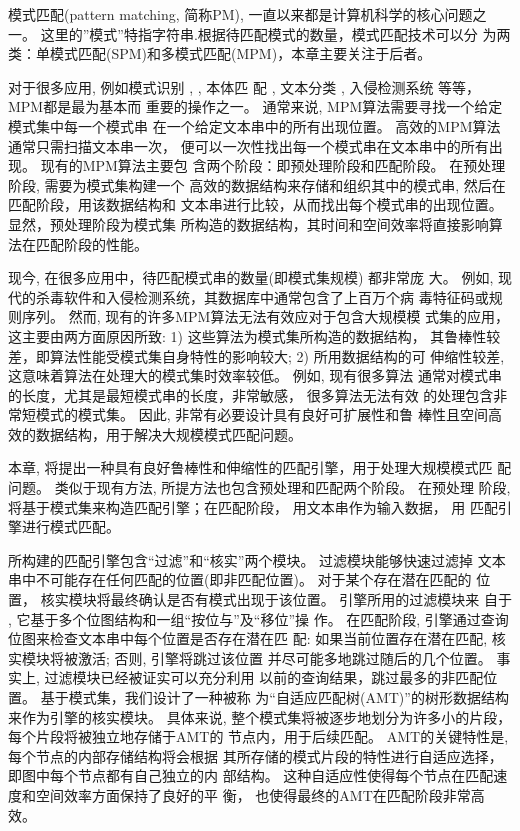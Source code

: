 \documentclass{ws-ijprai}
\begin{document}
模式匹配(pattern matching, 简称PM), 一直以来都是计算机科学的核心问题之
一。 这里的''模式''特指字符串.根据待匹配模式的数量，模式匹配技术可以分
为两类：单模式匹配(SPM)和多模式匹配(MPM)，本章主要关注于后者。

对于很多应用, 例如模式识别 \cite{Yan2016}, \cite{Xiao2016}, 本体匹
配 \cite{Xue2015} \cite{Xue2016}, 文本分类 \cite{Tang2015}
\cite{Zhang2016}, 入侵检测系统 \cite{Kim2015} 等等， MPM都是最为基本而
重要的操作之一。 通常来说, MPM算法需要寻找一个给定模式集中每一个模式串
在一个给定文本串中的所有出现位置。 高效的MPM算法通常只需扫描文本串一次，
便可以一次性找出每一个模式串在文本串中的所有出现。 现有的MPM算法主要包
含两个阶段：即预处理阶段和匹配阶段。 在预处理阶段, 需要为模式集构建一个
高效的数据结构来存储和组织其中的模式串, 然后在匹配阶段，用该数据结构和
文本串进行比较，从而找出每个模式串的出现位置。 显然，预处理阶段为模式集
所构造的数据结构，其时间和空间效率将直接影响算法在匹配阶段的性能。

现今, 在很多应用中，待匹配模式串的数量(即模式集规模) 都非常庞
大。 例如, 现代的杀毒软件和入侵检测系统，其数据库中通常包含了上百万个病
毒特征码或规则序列。 然而, 现有的许多MPM算法无法有效应对于包含大规模模
式集的应用，这主要由两方面原因所致: 1) 这些算法为模式集所构造的数据结构，
其鲁棒性较差，即算法性能受模式集自身特性的影响较大; 2) 所用数据结构的可
伸缩性较差, 这意味着算法在处理大的模式集时效率较低。 例如, 现有很多算法
通常对模式串的长度，尤其是最短模式串的长度，非常敏感， 很多算法无法有效
的处理包含非常短模式的模式集。 因此, 非常有必要设计具有良好可扩展性和鲁
棒性且空间高效的数据结构，用于解决大规模模式匹配问题。

本章, 将提出一种具有良好鲁棒性和伸缩性的匹配引擎，用于处理大规模模式匹
配问题。 类似于现有方法, 所提方法也包含预处理和匹配两个阶段。 在预处理
阶段,将基于模式集来构造匹配引擎；在匹配阶段， 用文本串作为输入数据， 用
匹配引擎进行模式匹配。


所构建的匹配引擎包含“过滤”和“核实”两个模块。 过滤模块能够快速过滤掉
文本串中不可能存在任何匹配的位置(即非匹配位置)。 对于某个存在潜在匹配的
位置， 核实模块将最终确认是否有模式出现于该位置。 引擎所用的过滤模块来
自于 \cite{Lee2013}, 它基于多个位图结构和一组“按位与”及“移位”操
作。 在匹配阶段, 引擎通过查询位图来检查文本串中每个位置是否存在潜在匹
配: 如果当前位置存在潜在匹配, 核实模块将被激活; 否则, 引擎将跳过该位置
并尽可能多地跳过随后的几个位置。 事实上, 过滤模块已经被证实可以充分利用
以前的查询结果，跳过最多的非匹配位置。 基于模式集，我们设计了一种被称
为“自适应匹配树(AMT)”的树形数据结构来作为引擎的核实模块。 具体来说,
整个模式集将被逐步地划分为许多小的片段， 每个片段将被独立地存储于AMT的
节点内，用于后续匹配。 AMT的关键特性是, 每个节点的内部存储结构将会根据
其所存储的模式片段的特性进行自适应选择，即图中每个节点都有自己独立的内
部结构。 这种自适应性使得每个节点在匹配速度和空间效率方面保持了良好的平
衡， 也使得最终的AMT在匹配阶段非常高效。
\end{document}
